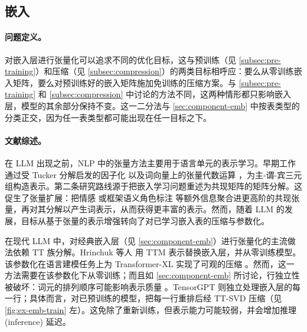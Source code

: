 \documentclass[11pt]{article}
\begin{document}


\subsection{嵌入}
\label{subsec:embeddings}

\paragraph{问题定义。}

对嵌入层进行张量化可以追求不同的优化目标，这与预训练（见 \cref{subsec:pre-training}）和压缩（见 \cref{subsec:compression}）的两类目标相呼应：要么从零训练嵌入矩阵，要么对预训练好的嵌入矩阵施加免训练的压缩方案。与 \cref{subsec:pre-training} 和 \cref{subsec:compression} 中讨论的方法不同，这两种情形都只影响嵌入层，模型的其余部分保持不变。这一二分法与 \cref{sec:component-emb} 中按表类型的分类正交，因为任一表类型都可能出现在任一目标之下。

\paragraph{文献综述。}

在 LLM 出现之前，NLP 中的张量方法主要用于语言单元的表示学习。早期工作通过受 Tucker 分解启发的因子化 \cite{cruys2013svo} 以及词向量上的张量代数运算 \cite{etal2014svotensorspaces}，为主-谓-宾三元组构造表示。第二条研究路线源于把嵌入学习问题重述为共现矩阵的矩阵分解。这促生了张量扩展：把情感 \cite{rahimi2021tenssent} 或框架语义角色标注 \cite{etal2017frame} 等额外信息聚合进更高阶的共现张量，再对其分解以产生词表示，从而获得更丰富的表示。然而，随着 LLM 的发展，目标从基于张量的表示增强转向了对已学习嵌入表的压缩与参数化。

在现代 LLM 中，对经典嵌入层（见 \cref{sec:component-emb}）进行张量化的主流做法依赖 TT 族分解。Hrinchuk 等人 \cite{hrinchuk2020tensorized} 用 TTM 表示替换嵌入层，并从零训练模型。
该参数化在语言建模任务上为 Transformer-XL \cite{dai2019transformerxl} 实现了可观的压缩 \cite{hrinchuk2020tensorized}。然而，这一方法需要在该参数化下从零训练；而且如 \cref{sec:component-emb} 所讨论，行独立性被破坏：词元的排列顺序可能影响表示质量 \cite{hrinchuk2020tensorized}。TensorGPT \cite{xu2023tensorgpt} 则独立处理嵌入层的每一行；具体而言，对已预训练的模型，把每一行重排后经 TT-SVD \cite{oseledets2011tensor} 压缩（见 \cref{fig:ex-emb-train} 左）。这免除了重新训练，但表示能力可能较弱，并会增加推理 (inference) 延迟。
\end{document}
